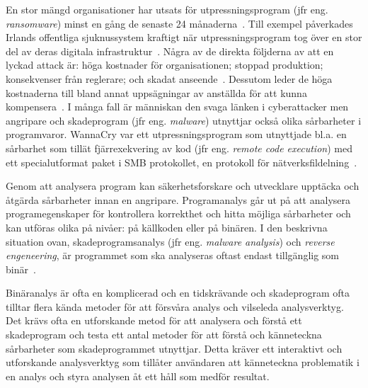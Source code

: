 En stor mängd organisationer har utsats för utpressningsprogram (jfr eng.
\emph{ransomware}) minst en gång de senaste 24 månaderna~\cite{cyberreason2021,
cyberreason2022}. Till exempel påverkades Irlands offentliga sjuknussystem
kraftigt när utpressningsprogram tog över en stor del av deras digitala
infrastruktur~\cite{hse_report, gallagher2023}.
Några av de direkta följderna av att en lyckad attack är: höga kostnader för
organisationen; stoppad produktion; konsekvenser från reglerare;
och skadat anseende~\cite{cyberreason2021, cyberreason2022}. Dessutom leder
de höga kostnaderna till bland annat uppsägningar av anställda för att kunna
kompensera~\cite{cyberreason2021, cyberreason2022}. I
många fall är människan den svaga länken i cyberattacker men angripare och
skadeprogram (jfr eng. \emph{malware}) utnyttjar också olika sårbarheter i
programvaror. WannaCry var ett utpressningsprogram som utnyttjade bl.a. en
sårbarhet som tillät fjärrexekvering av kod (jfr eng. \emph{remote code
execution}) med ett specialutformat paket i SMB protokollet, en protokoll
för nätverksfildelning~\cite{enwiki:1152151996}.


Genom att analysera program kan säkerhetsforskare och utvecklare upptäcka
och åtgärda sårbarheter innan en angripare. Programanalys går ut på att
analysera programegenskaper för kontrollera korrekthet och hitta möjliga
sårbarheter och kan utföras olika på nivåer: på källkoden eller på binären. I
den beskrivna situation ovan, skadeprogramsanalys (jfr eng. \emph{malware
analysis}) och \emph{reverse engeneering}, är programmet som ska analyseras
oftast endast tillgänglig som binär~\cite{andriesse2018}.

Binäranalys är ofta en komplicerad och en tidskrävande och skadeprogram
ofta tilltar flera kända metoder för att försvåra analys och vilseleda
analysverktyg. Det krävs ofta en utforskande metod för att analysera och förstå
ett skadeprogram och testa ett antal metoder för att förstå och känneteckna
sårbarheter som skadeprogrammet utnyttjar. Detta kräver ett interaktivt och
utforskande analysverktyg som tillåter användaren att känneteckna problematik i
en analys och styra analysen åt ett håll som medför resultat.

